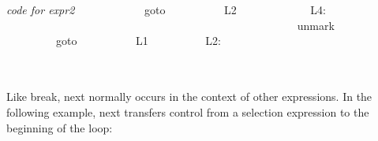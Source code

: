 \begin{center}
{ \textit{code for expr2\newline
} \ \ \ \ \ \ \ \ \ \ \ \ goto \ \ \ \ \ \ \ \ \ \ L2 \ \ \ \ \ \ \ \ \ \ \ \ \newline
L4: \ \ \ \ \ \ \ \ \ \ \ \ \ \ \ \ \ \ \ \ \ \ \ \ \ \ \ \ \ \ \ \ \ \ \ \ \ \ \ \ \ \ \ \ \ \ \ \ \ \ \ \ \newline
unmark \ \ \ \ \ \ \ \ \ \newline
 \ \ \ \ \ \ \ \ \ goto \ \ \ \ \ \ \ \ \ \ L1 \ \ \ \ \ \ \ \ \ \newline
L2: \ \ \ \ \ \ \ \ \ \ \ \ \ \ \ \ \ \ \ \ \ \ \ \ \ \ \ \ \ \ \ \ \ \ \ \ \ \ \ \ \ \ \ \ \ \ \ \ \ \ \ \ \\}
\tabletail{}
\tablelasttail{}
\begin{supertabular}{|m{1.9073598in}|m{2.75596in}|}

\end{supertabular}
\end{center}

Like break, next normally occurs in the context of other
expressions. In the following example, next transfers control from a
selection expression to the beginning of the loop:

